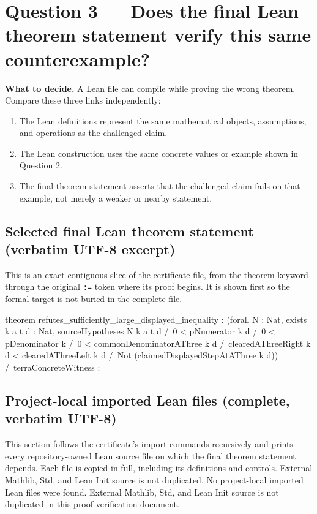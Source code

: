 \documentclass[11pt]{article}
\begin{document}
\section*{Question 3 --- Does the final Lean theorem statement verify this same counterexample?}
\textbf{What to decide.} A Lean file can compile while proving the wrong theorem. Compare these three links independently:
\begin{enumerate}
\item The Lean definitions represent the same mathematical objects, assumptions, and operations as the challenged claim.
\item The Lean construction uses the same concrete values or example shown in Question 2.
\item The final theorem statement asserts that the challenged claim fails on that example, not merely a weaker or nearby statement.
\end{enumerate}
\subsection*{Selected final Lean theorem statement (verbatim UTF-8 excerpt)}
This is an exact contiguous slice of the certificate file, from the theorem keyword through the original \texttt{:=} token where its proof begins. It is shown first so the formal target is not buried in the complete file.
\begin{Vlean}
theorem refutes_sufficiently_large_displayed_inequality :
    (forall N : Nat, exists k a t d : Nat,
      sourceHypotheses N k a t d /\
      0 < pNumerator k d /\
      0 < pDenominator k /\
      0 < commonDenominatorAThree k d /\
      clearedAThreeRight k d < clearedAThreeLeft k d /\
      Not (claimedDisplayedStepAtAThree k d)) /\
    terraConcreteWitness :=
\end{Vlean}
\subsection*{Project-local imported Lean files (complete, verbatim UTF-8)}
This section follows the certificate's import commands recursively and prints every repository-owned Lean source file on which the final theorem statement depends. Each file is copied in full, including its definitions and controls. External Mathlib, Std, and Lean Init source is not duplicated.
No project-local imported Lean files were found. External Mathlib, Std, and Lean Init source is not duplicated in this proof verification document.
\end{document}
